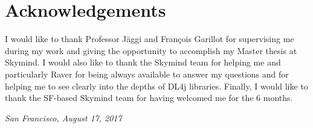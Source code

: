 \chapter*{Acknowledgements}

I would like to thank Professor Jäggi and François Garillot for supervising me during my work and giving the opportunity to accomplish my Master thesis at Skymind. I would also like to thank the Skymind team for helping me and particularly Raver for being always available to answer my questions and for helping me to see clearly into the depths of DL4j libraries. Finally, I would like to thank the SF-based Skymind team for having welcomed me for the 6 months.



\bigskip
 
\noindent\textit{San Francisco, August 17, 2017}
